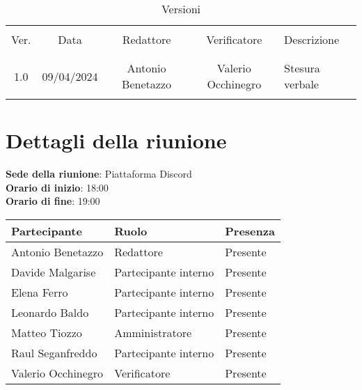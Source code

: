 \documentclass[italian,12pt]{article}
\begin{document}


\newpage



\begin{table}[!h]
	\caption{Versioni}
	\footnotesize
	\begin{center}
		\begin{tabular}{ c c c c p{6.1cm} }
			\hline                                                                        \\[-2ex]
			Ver. & Data       & Redattore          & Verificatore       & Descrizione     \\
			\\[-2ex] \hline \\[-1.5ex]
			1.0  & 09/04/2024 & Antonio Benetazzo  & Valerio Occhinegro & Stesura verbale \\
			\\[-1.5ex] \hline
		\end{tabular}
	\end{center}
\end{table}

\newpage

\tableofcontents

\newpage

\section{Dettagli della riunione}


\textbf{Sede della riunione}: Piattaforma Discord\\
\textbf{Orario di inizio}: 18:00\\
\textbf{Orario di fine}: 19:00\\


\begin{flushleft}
	\begin{table}[!h]
	\begin{tabular}{ |l|l|l| } 
		\hline
		\textbf{Partecipante} & \textbf{Ruolo}       & \textbf{Presenza} \\
		\hline 
		Antonio Benetazzo     & Redattore            & Presente          \\
		Davide Malgarise      & Partecipante interno & Presente          \\
		Elena Ferro           & Partecipante interno & Presente          \\
		Leonardo Baldo        & Partecipante interno & Presente          \\
		Matteo Tiozzo         & Amministratore       & Presente          \\
		Raul Seganfreddo      & Partecipante interno & Presente          \\
		Valerio Occhinegro    & Verificatore         & Presente          \\
		\hline
	\end{tabular}
	\end{table}
\end{flushleft}
\end{document}
